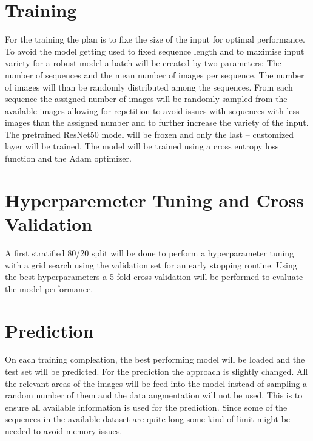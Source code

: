 \documentclass{article}
\begin{document}
\section*{Training} %

For the training the plan is to fixe the size of the input for optimal performance. To avoid the model getting used to 
fixed sequence length and to maximise input variety for a robust model a batch will be created by two parameters: 
The number of sequences and the mean number of images per sequence. The number of images will than be randomly 
distributed among the sequences. From each sequence the assigned number of images will be randomly sampled
from the available images allowing for repetition to avoid issues with sequences with less images than the 
assigned number and to further increase the variety of the input. The pretrained ResNet50 model will be frozen and only 
the last -- customized layer will be trained. The model will be trained using a cross entropy loss function and the 
Adam optimizer.

\section*{Hyperparemeter Tuning and Cross Validation} %

A first stratified 80/20 split will be done to perform a hyperparameter tuning with a grid search using the validation
set for an early stopping routine. Using the best hyperparameters a 5 fold cross validation will be performed to
evaluate the model performance.

\section*{Prediction} %

On each training compleation, the best performing model will be loaded and the test set will be predicted. 
For the prediction the approach is slightly changed. All the relevant areas of the images will be feed into the model 
instead of sampling a random number of them and the data augmentation will not be used. 
This is to ensure all available information is used for the prediction. Since some of the sequences in the available 
dataset are quite long some kind of limit might be needed to avoid memory issues.
\end{document}
